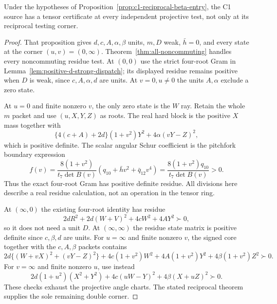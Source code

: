 \begin{corollary}
\label{cor:c1-reciprocal-beta-all-tests}
Under the hypotheses of Proposition~\ref{prop:c1-reciprocal-beta-entry},
the C1 source has a tensor certificate at every independent projective
test, not only at its reciprocal testing corner.
\end{corollary}
\begin{proof}
That proposition gives $d,c,A,\alpha,\beta$ units, $m,D$ weak,
$\bar h=0$, and every state at the corner $(u,v)=(0,\infty)$.
Theorem~\ref{thm:all-noncommuting} handles every noncommuting
residue test. At $(0,0)$ use the strict four-root Gram in
Lemma~\ref{lem:positive-d-strong-dispatch}; its displayed residue
remains positive when $D$ is weak, since $c,A,\alpha,d$ are units.
At $v=0,u\ne0$ the units $A,\alpha$ exclude a zero state.

At $u=0$ and finite nonzero $v$, the only zero state is the $W$ ray.
Retain the whole $m$ packet and use $(u,X,Y,Z)$ as roots. The real
hard block is the positive $X$ mass together with
\[
 \{4(c+A)+2d\}(1+v^2)Y^2+4\alpha(vY-Z)^2,
\]
which is positive definite. The scalar angular Schur coefficient
is the pitchfork boundary expression
\[
 f(v)=\frac{8(1+v^2)}{t_7\det B(v)}
      (q_{10}+\bar h v^2+\bar q_{12}v^4)
      =\frac{8(1+v^2)q_{10}}{t_7\det B(v)}>0.
\]
Thus the exact four-root Gram has positive definite residue.
All divisions here describe a real residue calculation, not an
operation in the tensor ring.

At $(\infty,0)$ the existing four-root identity has residue
\[
 2dR^2+2d(W+V)^2+4cW^2+4AY^2\succ0,
\]
so it does not need a unit $D$. At $(\infty,\infty)$ the residue
state matrix is positive definite since $c,\beta,d$ are units.
For $u=\infty$ and finite nonzero $v$, the signed core together
with the $c,A,\beta$ packets contains
\[
 2d\{(W+vX)^2+(vY-Z)^2\}
 +4c(1+v^2)W^2+4A(1+v^2)Y^2
 +4\beta(1+v^2)Z^2\succ0.
\]
For $v=\infty$ and finite nonzero $u$, use instead
\[
 2d(1+u^2)(X^2+Y^2)+4c(uW-Y)^2
                              +4\beta(X+uZ)^2\succ0.
\]
These checks exhaust the projective angle charts. The stated
reciprocal theorem supplies the sole remaining double corner.
\end{proof}
